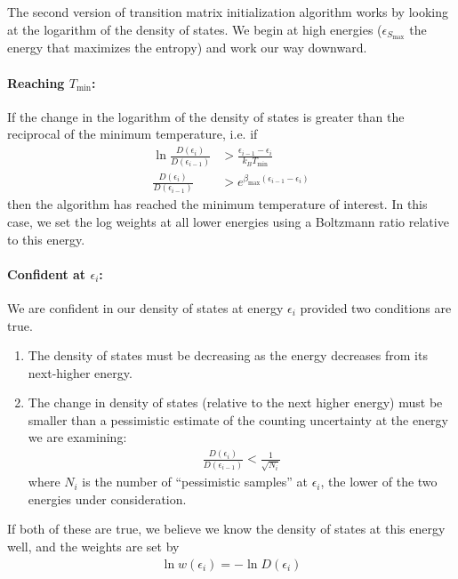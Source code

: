 \documentclass[letterpaper,twocolumn,amsmath,amssymb,pre,aps,10pt]{revtex4-1}
\begin{document}
The second version of transition matrix initialization algorithm works
by looking at the logarithm of the density of states.  We begin at
high energies ($\epsilon_{S_{\max}}$ the energy that maximizes the entropy) and work our way
downward.

\paragraph{Reaching $T_{\min}$:}
If the change in the logarithm of the density of states is greater
than the reciprocal of the minimum temperature, i.e. if
\begin{align}
  \ln\frac{D(\epsilon_i)}{D(\epsilon_{i-1})} &>
  \frac{\epsilon_{i-1} - \epsilon_i}{k_BT_{\min}}
  \\
  \frac{D(\epsilon_i)}{D(\epsilon_{i-1})} &>
  e^{\beta_{\max}(\epsilon_{i-1} - \epsilon_i)}
\end{align}
then the algorithm has reached the minimum temperature of interest.
In this case, we set the log weights at all lower energies using a
Boltzmann ratio relative to this energy.
\paragraph{Confident at $\epsilon_i$:} We are confident in our density
of states at energy $\epsilon_i$ provided two conditions are true.
\begin{enumerate}
\item The density of states must be decreasing as the energy decreases
  from its next-higher energy.
\item The change in density of states (relative to the next higher
  energy) must be smaller than a pessimistic estimate of the counting
  uncertainty at the energy we are examining:
  \begin{align}
    \frac{D(\epsilon_i)}{D(\epsilon_{i-1})} < \frac1{\sqrt{N_i}}
  \end{align}
  where $N_i$ is the number of ``pessimistic
  samples'' at $\epsilon_i$, the lower of the two energies under
  consideration.
\end{enumerate}
If both of these are true, we believe we know the density of states at
this energy well, and the weights are set by
\begin{align}
  \ln w(\epsilon_i) = -\ln{D}(\epsilon_i)
\end{align}
\end{document}
